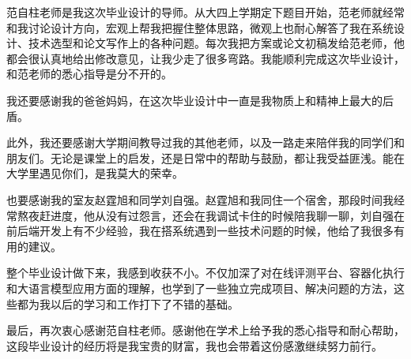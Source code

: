\begin{acknowledgements}

范自柱老师是我这次毕业设计的导师。从大四上学期定下题目开始，范老师就经常和我讨论设计方向，宏观上帮我把握住整体思路，微观上也耐心解答了我在系统设计、技术选型和论文写作上的各种问题。每次我把方案或论文初稿发给范老师，他都会很认真地给出修改意见，让我少走了很多弯路。我能顺利完成这次毕业设计，和范老师的悉心指导是分不开的。

我还要感谢我的爸爸妈妈，在这次毕业设计中一直是我物质上和精神上最大的后盾。

此外，我还要感谢大学期间教导过我的其他老师，以及一路走来陪伴我的同学们和朋友们。无论是课堂上的启发，还是日常中的帮助与鼓励，都让我受益匪浅。能在大学里遇见你们，是我莫大的荣幸。

也要感谢我的室友赵霆旭和同学刘自强。赵霆旭和我同住一个宿舍，那段时间我经常熬夜赶进度，他从没有过怨言，还会在我调试卡住的时候陪我聊一聊，刘自强在前后端开发上有不少经验，我在搭系统遇到一些技术问题的时候，他给了我很多有用的建议。

整个毕业设计做下来，我感到收获不小。不仅加深了对在线评测平台、容器化执行和大语言模型应用方面的理解，也学到了一些独立完成项目、解决问题的方法，这些都为我以后的学习和工作打下了不错的基础。

最后，再次衷心感谢范自柱老师。感谢他在学术上给予我的悉心指导和耐心帮助，这段毕业设计的经历将是我宝贵的财富，我也会带着这份感激继续努力前行。

\end{acknowledgements}
